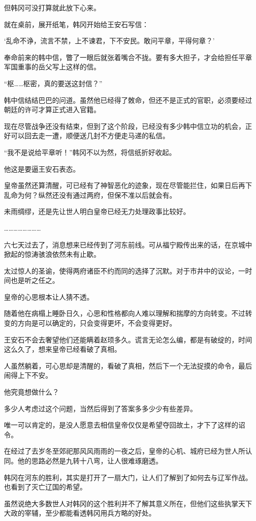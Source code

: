 但韩冈可没打算就此放下心来。

就在桌前，展开纸笔，韩冈开始给王安石写信：

‘乱命不诤，流言不禁，上不谏君，下不安民。敢问平章，平得何章？’

奉命前来的韩中信，瞥了一眼后就张着嘴合不拢。要有多大担子，才会给担任平章军国重事的岳父写上这样的信。

“枢……枢密，真的要送这封信？”

韩中信结结巴巴的问道。虽然他已经得了敇命，但还不是正式的官职，必须要经过朝廷的许可才算正式进入官籍。

现在尽管战争还没有结束，但到了这个阶段，已经没有多少韩中信立功的机会，正好可以回去走一遭，顺便送几封不方便走马递的私信。

“我不是说给平章听！”韩冈不以为然，将信纸折好收起。

他这是要逼王安石表态。

皇帝虽然还算清醒，可已经有了神智恶化的迹象，现在尽管能拦住，如果日后再下乱命为何？纵然还没有通过两府，但保不准以后就会有。

未雨绸缪，还是先让世人明白皇帝已经无力处理政事比较好。

……………………

六七天过去了，消息想来已经传到了河东前线。可从福宁殿传出来的话，在京城中掀起的惊涛骇浪依然未有止歇。

太过惊人的圣谕，使得两府诸臣不约而同的选择了沉默。对于市井中的议论，一时间也是听之任之。

皇帝的心思根本让人猜不透。

随着他在病榻上睡卧日久，心思和性格都向人难以理解和揣摩的方向转变。不过转变的方向是可以确定的，只会变得更坏，不会变得更好。

王安石不会去奢望他们还能瞒着赵顼多久。谎言无论怎么编，都是有破绽的，时间这么久了，想来皇帝已经看破了真相。

人虽然躺着，可心思却是清醒的，看破了真相，然后下一个无法捉摸的命令，最后闹得上下不安。

他究竟想做什么？

多少人考虑过这个问题，当然后得到了答案多多少少有些差异。

唯一可以肯定的，是没人愿意去相信皇帝仅仅是希望夺回故土，才下了这样的诏令。

在经过了去岁冬至郊祀那风风雨雨的一夜之后，皇帝的心机、城府已经为世人所认同。他的思路必然是九转十八弯，让人很难琢磨透。

韩冈在河东的胜利，其实是打开了一扇大门，让人们了解到了如何去与辽军作战。也看到了灭亡辽国的希望。

虽然说绝大多数世人对韩冈的这个胜利并不了解其意义所在，但他们这些执掌天下大政的宰辅，至少都能看透韩冈用兵方略的好处。

